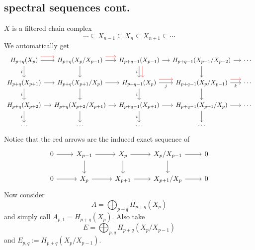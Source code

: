 \documentclass{article}
\begin{document}
\subsection{spectral sequences cont.}
$X$ is a filtered chain complex
\[\cdots\subseteq X_{n-1}\subseteq X_{n}\subseteq X_{n+1}\subseteq\cdots\]
We automatically get
\[\begin{tikzcd}[column sep=small]
	H_{p+q}(X_p)\arrow[r]\arrow[d,"i",swap]\arrow[r,red,shift={(0,0.2)}]&H_{p+q}(X_p/X_{p-1})\arrow[r]\arrow[r,red,shift={(0,0.2)}]\arrow[d]&H_{p+q-1}(X_{p-1})\arrow[r]\arrow[d,red,shift={(0.2,0)}]\arrow[d,"i",swap]&H_{p+q-1}(X_{p-1}/X_{p-2})\arrow[d]\arrow[r]&\cdots\\
	H_{p+q}(X_{p+1})\arrow[r]\arrow[d,"i",swap]&H_{p+q}(X_{p+1}/X_{p})\arrow[r]\arrow[d]&H_{p+q-1}(X_{p})\arrow[r,"j",swap]\arrow[r,red,shift={(0,0.2)}]\arrow[d,"i",swap]&H_{p+q-1}(X_{p}/X_{p-1})\arrow[r,red,shift={(0,0.2)}]\arrow[d]\arrow[r,"k",swap]&\cdots\\
	H_{p+q}(X_{p+2})\arrow[r]\arrow[d,"i",swap]&H_{p+q}(X_{p+2}/X_{p+1})\arrow[r]\arrow[d]&H_{p+q-1}(X_{p+1})\arrow[r]\arrow[d,"i",swap]&H_{p+q-1}(X_{p+1}/X_{p})\arrow[d]\arrow[r]&\cdots\\
	\cdots&\cdots&\cdots&\cdots
\end{tikzcd}\]
Notice that the red arrows are the induced exact sequence of
\[\begin{tikzcd}
	0\arrow[r]&X_{p-1}\arrow[r]\arrow[d]&X_{p}\arrow[r]\arrow[d]&X_{p}/X_{p-1}\arrow[r]\arrow[d]&0\\
	0\arrow[r]&X_p\arrow[r]&X_{p+1}\arrow[r]&X_{p+1}/X_p\arrow[r]&0
\end{tikzcd}\]
Now consider
\[A=\bigoplus_{p+q}H_{p+q}(X_p)\]
and simply call $A_{p,1}=H_{p+q}(X_p)$. Also take
\[E=\bigoplus_{p,q}H_{p+q}(X_p/X_{p-1})\]
and $E_{p,q}:=H_{p+q}(X_p/X_{p-1})$.
\end{document}
